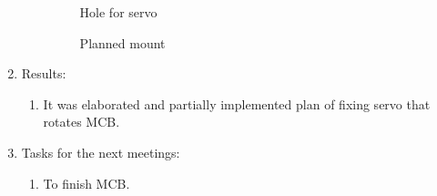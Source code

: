 \begin{enumerate}
\begin{enumerate}
\begin{figure}[H]
\begin{minipage}[h]{0.31\linewidth}
      		\caption{Hole for servo}
      	\end{minipage}
      	\hfill
      	\begin{minipage}[h]{0.31\linewidth}
      		\caption{Planned mount}
      	\end{minipage}
      \end{figure}
      
    \end{enumerate}
    
	\item Results: 
	\begin{enumerate}
	  \item It was elaborated and partially implemented plan of fixing servo that rotates MCB.  
	  
    \end{enumerate}
    
	\item Tasks for the next meetings:
	\begin{enumerate}
	  \item To finish MCB.
	  
    \end{enumerate}     
\end{enumerate}
\fillpage
